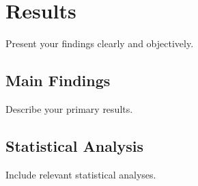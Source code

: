 \section{Results}
\label{sec:results}

Present your findings clearly and objectively.

\subsection{Main Findings}
Describe your primary results.

\subsection{Statistical Analysis}
Include relevant statistical analyses.